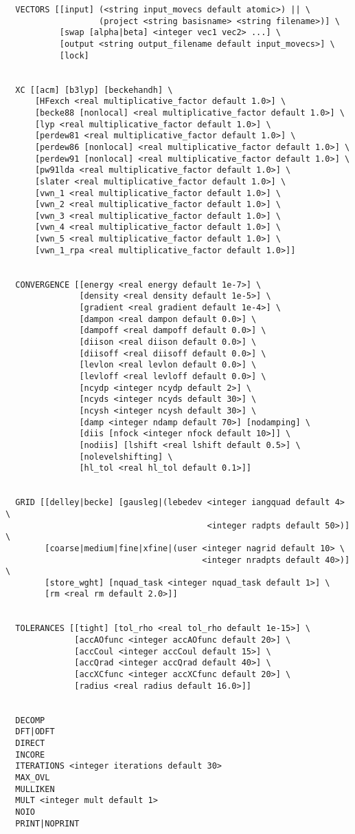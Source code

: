 \begin{verbatim}
  VECTORS [[input] (<string input_movecs default atomic>) || \
                   (project <string basisname> <string filename>)] \
           [swap [alpha|beta] <integer vec1 vec2> ...] \
           [output <string output_filename default input_movecs>] \
           [lock]


  XC [[acm] [b3lyp] [beckehandh] \
      [HFexch <real multiplicative_factor default 1.0>] \
      [becke88 [nonlocal] <real multiplicative_factor default 1.0>] \
      [lyp <real multiplicative_factor default 1.0>] \
      [perdew81 <real multiplicative_factor default 1.0>] \
      [perdew86 [nonlocal] <real multiplicative_factor default 1.0>] \
      [perdew91 [nonlocal] <real multiplicative_factor default 1.0>] \
      [pw91lda <real multiplicative_factor default 1.0>] \
      [slater <real multiplicative_factor default 1.0>] \
      [vwn_1 <real multiplicative_factor default 1.0>] \
      [vwn_2 <real multiplicative_factor default 1.0>] \
      [vwn_3 <real multiplicative_factor default 1.0>] \
      [vwn_4 <real multiplicative_factor default 1.0>] \
      [vwn_5 <real multiplicative_factor default 1.0>] \
      [vwn_1_rpa <real multiplicative_factor default 1.0>]]


  CONVERGENCE [[energy <real energy default 1e-7>] \
               [density <real density default 1e-5>] \
               [gradient <real gradient default 1e-4>] \
               [dampon <real dampon default 0.0>] \
               [dampoff <real dampoff default 0.0>] \
               [diison <real diison default 0.0>] \
               [diisoff <real diisoff default 0.0>] \
               [levlon <real levlon default 0.0>] \
               [levloff <real levloff default 0.0>] \
               [ncydp <integer ncydp default 2>] \
               [ncyds <integer ncyds default 30>] \
               [ncysh <integer ncysh default 30>] \
               [damp <integer ndamp default 70>] [nodamping] \
               [diis [nfock <integer nfock default 10>]] \
               [nodiis] [lshift <real lshift default 0.5>] \
               [nolevelshifting] \
               [hl_tol <real hl_tol default 0.1>]]


  GRID [[delley|becke] [gausleg|(lebedev <integer iangquad default 4> \
                                         <integer radpts default 50>)] \
        [coarse|medium|fine|xfine|(user <integer nagrid default 10> \
                                        <integer nradpts default 40>)] \
        [store_wght] [nquad_task <integer nquad_task default 1>] \
        [rm <real rm default 2.0>]]


  TOLERANCES [[tight] [tol_rho <real tol_rho default 1e-15>] \
              [accAOfunc <integer accAOfunc default 20>] \
              [accCoul <integer accCoul default 15>] \
              [accQrad <integer accQrad default 40>] \
              [accXCfunc <integer accXCfunc default 20>] \
              [radius <real radius default 16.0>]]


  DECOMP
  DFT|ODFT
  DIRECT
  INCORE
  ITERATIONS <integer iterations default 30>
  MAX_OVL
  MULLIKEN
  MULT <integer mult default 1>
  NOIO
  PRINT|NOPRINT
\end{verbatim}

